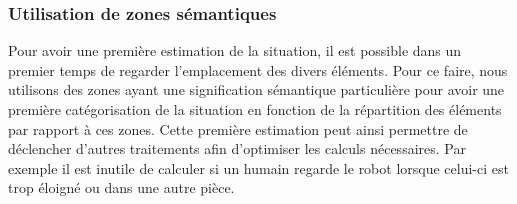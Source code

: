 \documentclass[a4paper,11pt,twoside]{StyleThese}
\begin{document}
\subsubsection{Utilisation de zones sémantiques}
\label{sec:zones}

Pour avoir une première estimation de la situation, il est possible dans un premier temps de regarder l'emplacement des divers éléments. Pour ce faire, nous utilisons des zones ayant une signification sémantique particulière pour avoir une première catégorisation de la situation en fonction de la répartition des éléments par rapport à ces zones. Cette première estimation peut ainsi permettre de déclencher d'autres traitements afin d'optimiser les calculs nécessaires.
Par exemple il est inutile de calculer si un humain regarde le robot lorsque celui-ci est trop éloigné ou dans une autre pièce.
\end{document}
